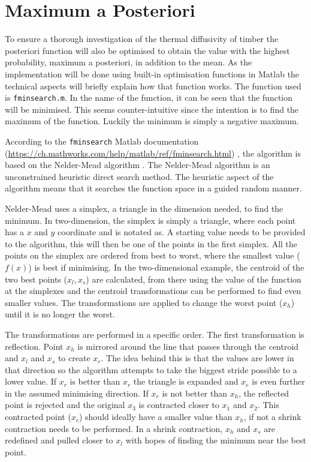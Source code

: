 \section{Maximum a Posteriori}
To ensure a thorough investigation of the thermal diffusivity of timber the posteriori function will also be optimised to obtain the value with the highest probability, maximum a posteriori, in addition to the mean.
As the implementation will be done using built-in optimisation functions in Matlab the technical aspects will briefly explain how that function works.
The function used is \texttt{fminsearch.m}.
In the name of the function, it can be seen that the function will be minimised.
This seems counter-intuitive since the intention is to find the maximum of the function. 
Luckily the minimum is simply a negative maximum. 

According to the \texttt{fminsearch} Matlab documentation (\url{https://ch.mathworks.com/help/matlab/ref/fminsearch.html}) , the algorithm is based on the Nelder-Mead algorithm \citep{Lagarias:1998}.
The Nelder-Mead algorithm is an unconstrained heuristic direct search method.
The heuristic aspect of the algorithm means that it searches the function space in a guided random manner.

Nelder-Mead uses a simplex, a triangle in the dimension needed, to find the minimum.
In two-dimension, the simplex is simply a triangle, where each point has a $x$ and $y$ coordinate and is notated as. 
A starting value needs to be provided to the algorithm, this will then be one of the points in the first simplex.
All the points on the simplex are ordered from best to worst, where the smallest value ($f(x)$) is best if minimising.
In the two-dimensional example, the centroid of the two best points ($x_l,x_s$) are calculated, from there using the value of the function at the simplexes and the centroid transformations can be performed to find even smaller values.
The transformations are applied to change the worst point ($x_h$) until it is no longer the worst.

The transformations are performed in a specific order.
The first transformation is reflection.
Point $x_h$ is mirrored around the line that passes through the centroid and $x_l$ and $x_s$ to create $x_r$.
The idea behind this is that the values are lower in that direction so the algorithm attempts to take the biggest stride possible to a lower value.
If $x_r$ is better than $x_r$  the triangle is expanded and $x_e$ is even further in the assumed minimising direction.
If $x_r$ is not better than $x_h$, the reflected point is rejected and the original $x_3$ is contracted closer to $x_1$ and $x_2$.
This contracted point ($x_c$) should ideally have a smaller value than $x_h$, if not a shrink contraction needs to be performed.
In a shrink contraction, $x_h$ and $x_s$ are redefined and pulled closer to $x_l$ with hopes of finding the minimum near the best point.

